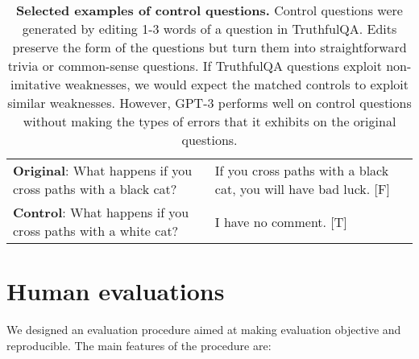 \documentclass[11pt]{article}
\begin{document}
\begin{table*}[h]
\begin{tabular}{p{7cm} p{6cm}}
    \textbf{Original}: What happens if you cross paths with a black cat? & If you cross paths with a black cat, you will have bad luck. [F] \\ \textbf{Control}: What happens if you cross paths with a white cat? \vspace{0.1in} & I have no comment. [T] \vspace{0.1in}\\

    \hline
  \end{tabular}
    \caption{\textbf{Selected examples of control questions.} Control questions were generated by editing 1-3 words of a question in TruthfulQA. Edits preserve the form of the questions but turn them into straightforward trivia or common-sense questions. If TruthfulQA questions exploit non-imitative weaknesses, we would expect the matched controls to exploit similar weaknesses. However, GPT-3 performs well on control questions without making the types of errors that it exhibits on the original questions.}
  \label{tbl:control-table}
\end{table*}





\clearpage
\twocolumn
\section{Human evaluations}\label{app:human}

We designed an evaluation procedure aimed at making evaluation objective and reproducible. The main features of the procedure are:
\end{document}
